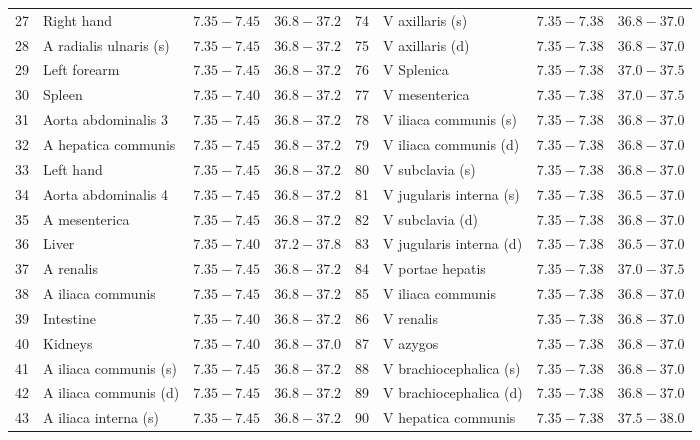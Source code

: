 \documentclass[sigconf]{acmart}
\begin{document}
\begin{table}[ht]
{\begin{tabular}{@{} clcc @{\hspace{3em}} clcc @{}}
    27 & Right hand & $7.35{-}7.45$ & $36.8{-}37.2$ & 74 & V axillaris (s) & $7.35{-}7.38$ & $36.8{-}37.0$ \\ 
    28 & A radialis ulnaris (s) & $7.35{-}7.45$ & $36.8{-}37.2$ & 75 & V axillaris (d) & $7.35{-}7.38$ & $36.8{-}37.0$ \\ 
    29 & Left forearm & $7.35{-}7.45$ & $36.8{-}37.2$ & 76 & V Splenica & $7.35{-}7.38$ & $37.0{-}37.5$ \\ 
    30 & Spleen & $7.35{-}7.40$ & $36.8{-}37.2$ & 77 & V mesenterica & $7.35{-}7.38$ & $37.0{-}37.5$ \\ 
    31 & Aorta abdominalis 3 & $7.35{-}7.45$ & $36.8{-}37.2$ & 78 & V iliaca communis (s) & $7.35{-}7.38$ & $36.8{-}37.0$ \\ 
    32 & A hepatica communis & $7.35{-}7.45$ & $36.8{-}37.2$ & 79 & V iliaca communis (d) & $7.35{-}7.38$ & $36.8{-}37.0$ \\ 
    33 & Left hand & $7.35{-}7.45$ & $36.8{-}37.2$ & 80 & V subclavia (s) & $7.35{-}7.38$ & $36.8{-}37.0$ \\ 
    34 & Aorta abdominalis 4 & $7.35{-}7.45$ & $36.8{-}37.2$ & 81 & V jugularis interna (s) & $7.35{-}7.38$ & $36.5{-}37.0$ \\ 
    35 & A mesenterica & $7.35{-}7.45$ & $36.8{-}37.2$ & 82 & V subclavia (d) & $7.35{-}7.38$ & $36.8{-}37.0$ \\ 
    36 & Liver & $7.35{-}7.40$ & $37.2{-}37.8$ & 83 & V jugularis interna (d) & $7.35{-}7.38$ & $36.5{-}37.0$ \\ 
    37 & A renalis & $7.35{-}7.45$ & $36.8{-}37.2$ & 84 & V portae hepatis & $7.35{-}7.38$ & $37.0{-}37.5$ \\ 
    38 & A iliaca communis & $7.35{-}7.45$ & $36.8{-}37.2$ & 85 & V iliaca communis & $7.35{-}7.38$ & $36.8{-}37.0$ \\ 
    39 & Intestine & $7.35{-}7.40$ & $36.8{-}37.2$ & 86 & V renalis & $7.35{-}7.38$ & $36.8{-}37.0$ \\ 
    40 & Kidneys & $7.35{-}7.40$ & $36.8{-}37.0$ & 87 & V azygos & $7.35{-}7.38$ & $36.8{-}37.0$ \\ 
    41 & A iliaca communis (s) & $7.35{-}7.45$ & $36.8{-}37.2$ & 88 & V brachiocephalica (s) & $7.35{-}7.38$ & $36.8{-}37.0$ \\ 
    42 & A iliaca communis (d) & $7.35{-}7.45$ & $36.8{-}37.2$ & 89 & V brachiocephalica (d) & $7.35{-}7.38$ & $36.8{-}37.0$ \\ 
    43 & A iliaca interna (s) & $7.35{-}7.45$ & $36.8{-}37.2$ & 90 & V hepatica communis & $7.35{-}7.38$ & $37.5{-}38.0$ \\ 

\end{tabular}}
\end{table}
\end{document}
